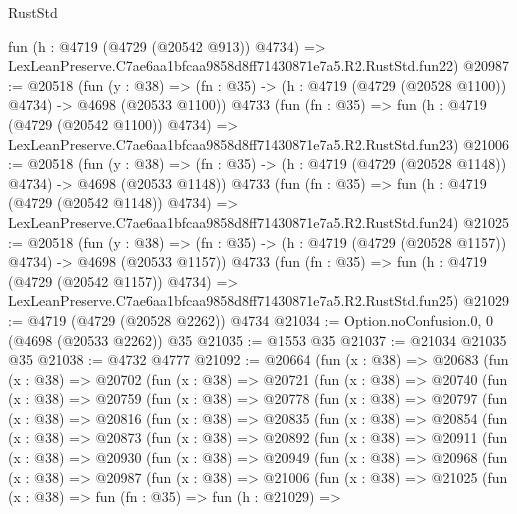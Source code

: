\begin{lexlean}{RustStd}
\begin{coremodule}
    fun (h : @4719 (@4729 (@20542 @913)) @4734) =>
    LexLeanPreserve.C7ae6aa1bfcaa9858d8ff71430871e7a5.R2.RustStd.fun22)
@20987 := @20518
    (fun (y : @38) =>
    (fn : @35) -> (h : @4719 (@4729 (@20528 @1100)) @4734) -> @4698 (@20533 @1100))
    @4733
    (fun (fn : @35) =>
    fun (h : @4719 (@4729 (@20542 @1100)) @4734) =>
    LexLeanPreserve.C7ae6aa1bfcaa9858d8ff71430871e7a5.R2.RustStd.fun23)
@21006 := @20518
    (fun (y : @38) =>
    (fn : @35) -> (h : @4719 (@4729 (@20528 @1148)) @4734) -> @4698 (@20533 @1148))
    @4733
    (fun (fn : @35) =>
    fun (h : @4719 (@4729 (@20542 @1148)) @4734) =>
    LexLeanPreserve.C7ae6aa1bfcaa9858d8ff71430871e7a5.R2.RustStd.fun24)
@21025 := @20518
    (fun (y : @38) =>
    (fn : @35) -> (h : @4719 (@4729 (@20528 @1157)) @4734) -> @4698 (@20533 @1157))
    @4733
    (fun (fn : @35) =>
    fun (h : @4719 (@4729 (@20542 @1157)) @4734) =>
    LexLeanPreserve.C7ae6aa1bfcaa9858d8ff71430871e7a5.R2.RustStd.fun25)
@21029 := @4719 (@4729 (@20528 @2262)) @4734
@21034 := Option.noConfusion.{0, 0} (@4698 (@20533 @2262)) @35
@21035 := @1553 @35
@21037 := @21034 @21035 @35
@21038 := @4732 @4777
@21092 := @20664
    (fun (x : @38) =>
    @20683
      (fun (x : @38) =>
      @20702
        (fun (x : @38) =>
        @20721
          (fun (x : @38) =>
          @20740
            (fun (x : @38) =>
            @20759
              (fun (x : @38) =>
              @20778
                (fun (x : @38) =>
                @20797
                  (fun (x : @38) =>
                  @20816
                    (fun (x : @38) =>
                    @20835
                      (fun (x : @38) =>
                      @20854
                        (fun (x : @38) =>
                        @20873
                          (fun (x : @38) =>
                          @20892
                            (fun (x : @38) =>
                            @20911
                              (fun (x : @38) =>
                              @20930
                                (fun (x : @38) =>
                                @20949
                                  (fun (x : @38) =>
                                  @20968
                                    (fun (x : @38) =>
                                    @20987
                                      (fun (x : @38) =>
                                      @21006
                                        (fun (x : @38) =>
                                        @21025
                                          (fun (x : @38) =>
                                          fun (fn : @35) =>
                                          fun (h : @21029) =>

\end{coremodule}
\end{lexlean}
